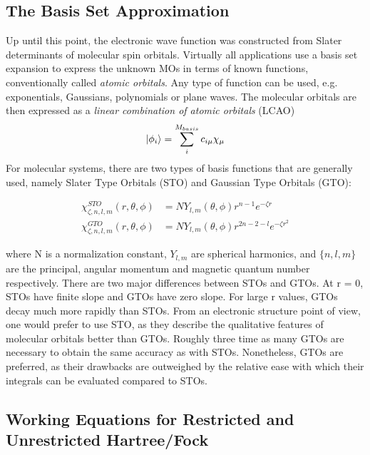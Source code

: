 \subsection{The Basis Set Approximation}

Up until this point, the electronic wave function was constructed from Slater determinants of molecular spin orbitals. Virtually all applications use a basis set expansion to express the unknown MOs in terms of known functions, conventionally called \emph{atomic orbitals}. Any type of function can be used, e.g. exponentials, Gaussians, polynomials or plane waves. The molecular orbitals are then expressed as a \emph{linear combination of atomic orbitals} (LCAO)
\begin{equation}
\ket{\phi_i} = \sum_i^{M_{basis}} c_{i\mu} \chi_{\mu} 
\end{equation}
\noindent For molecular systems, there are two types of basis functions that are generally used, namely Slater Type Orbitals (STO) and Gaussian Type Orbitals (GTO):

\begin{align}
\chi_{\zeta, n, l, m}^{STO} (r,\theta ,\phi ) &= N Y_{l,m} (\theta , \phi ) r^{n-1} e^{-\zeta r}
\\
\chi_{\zeta, n, l, m}^{GTO} (r,\theta ,\phi ) &= N Y_{l,m} (\theta , \phi ) r^{2n - 2 - l} e^{-\zeta r^2}
\end{align}

\noindent where N is a normalization constant, $Y_{l,m}$ are spherical harmonics, and $\{n,l,m\}$ are the principal, angular momentum and magnetic quantum number respectively. There are two major differences between STOs and GTOs. At r = 0, STOs have finite slope and GTOs have zero slope. For large r values, GTOs decay much more rapidly than STOs. From an electronic structure point of view, one would prefer to use STO, as they describe the qualitative features of molecular orbitals better than GTOs. Roughly three time as many GTOs are necessary to obtain the same accuracy as with STOs. Nonetheless, GTOs are preferred, as their drawbacks are outweighed by the relative ease with which their integrals can be evaluated compared to STOs.

\subsection{Working Equations for Restricted and Unrestricted Hartree\-/Fock}

